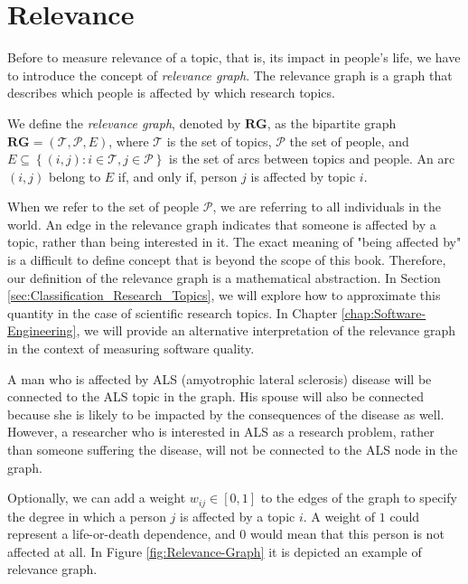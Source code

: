 %
%

\section{Relevance}

Before to measure relevance of a topic, that is, its impact in people's life, we have to introduce the concept of \emph{relevance graph}. The relevance graph is a graph that describes which people is affected by which research topics.

\begin{definition}
\label{def:relevance-graph}
We define the \emph{relevance graph}, denoted by $\mathbf{RG}$, as the bipartite graph $\mathbf{RG} = (\mathcal{T}, \mathcal{P}, E)$, where $\mathcal{T}$ is the set of topics, $\mathcal{P}$ the set of people, and $E\subseteq\left\{ \left(i,j\right):i\in \mathcal{T},j\in \mathcal{P} \right\}$ is the set of arcs between topics and people. An arc $(i, j)$ belong to $E$ if, and only if, person $j$ is affected by topic $i$.
\end{definition}

When we refer to the set of people $\mathcal{P}$, we are referring to all individuals in the world. An edge in the relevance graph indicates that someone is affected by a topic, rather than being interested in it. The exact meaning of "being affected by" is a difficult to define concept that is beyond the scope of this book. Therefore, our definition of the relevance graph is a mathematical abstraction. In Section \ref{sec:Classification_Research_Topics}, we will explore how to approximate this quantity in the case of scientific research topics. In Chapter \ref{chap:Software-Engineering}, we will provide an alternative interpretation of the relevance graph in the context of measuring software quality.

\begin{example}
A man who is affected by ALS (amyotrophic lateral sclerosis) disease will be connected to the ALS topic in the graph. His spouse will also be connected because she is likely to be impacted by the consequences of the disease as well. However, a researcher who is interested in ALS as a research problem, rather than someone suffering the disease, will not be connected to the ALS node in the graph.
\end{example}

Optionally, we can add a weight $w_{ij}\in\left[0,1\right]$ to the edges of the graph to specify the degree in which a person $j$ is affected by a topic $i$. A weight of $1$ could represent a life-or-death dependence, and $0$ would mean that this person is not affected at all. In Figure \ref{fig:Relevance-Graph} it is depicted an example of relevance graph. 

